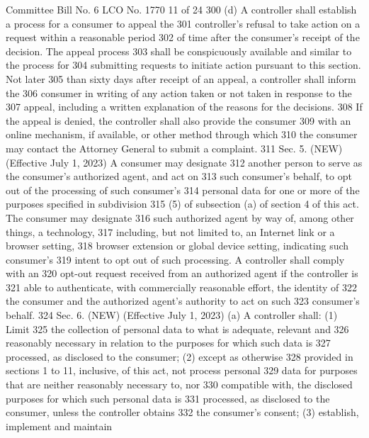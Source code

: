 Committee Bill No. 6
LCO No. 1770 11 of 24
300 (d) A controller shall establish a process for a consumer to appeal the
301 controller's refusal to take action on a request within a reasonable period
302 of time after the consumer's receipt of the decision. The appeal process
303 shall be conspicuously available and similar to the process for
304 submitting requests to initiate action pursuant to this section. Not later
305 than sixty days after receipt of an appeal, a controller shall inform the
306 consumer in writing of any action taken or not taken in response to the
307 appeal, including a written explanation of the reasons for the decisions.
308 If the appeal is denied, the controller shall also provide the consumer
309 with an online mechanism, if available, or other method through which
310 the consumer may contact the Attorney General to submit a complaint.
311 Sec. 5. (NEW) (Effective July 1, 2023) A consumer may designate
312 another person to serve as the consumer's authorized agent, and act on
313 such consumer's behalf, to opt out of the processing of such consumer's
314 personal data for one or more of the purposes specified in subdivision
315 (5) of subsection (a) of section 4 of this act. The consumer may designate
316 such authorized agent by way of, among other things, a technology,
317 including, but not limited to, an Internet link or a browser setting,
318 browser extension or global device setting, indicating such consumer's
319 intent to opt out of such processing. A controller shall comply with an
320 opt-out request received from an authorized agent if the controller is
321 able to authenticate, with commercially reasonable effort, the identity of
322 the consumer and the authorized agent's authority to act on such
323 consumer's behalf.
324 Sec. 6. (NEW) (Effective July 1, 2023) (a) A controller shall: (1) Limit
325 the collection of personal data to what is adequate, relevant and
326 reasonably necessary in relation to the purposes for which such data is
327 processed, as disclosed to the consumer; (2) except as otherwise
328 provided in sections 1 to 11, inclusive, of this act, not process personal
329 data for purposes that are neither reasonably necessary to, nor
330 compatible with, the disclosed purposes for which such personal data is
331 processed, as disclosed to the consumer, unless the controller obtains
332 the consumer's consent; (3) establish, implement and maintain 

